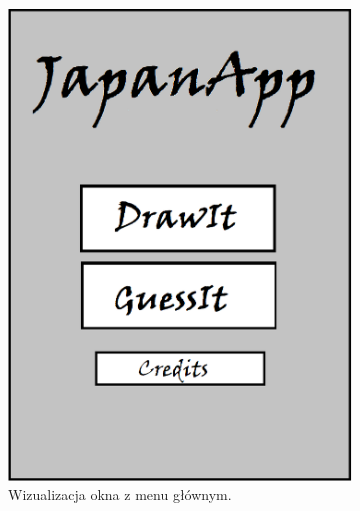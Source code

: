 \documentclass[15pt]{article}
\begin{document}
  \begin{figure}[h!]
    \centering
    \begin{subfigure}[b]{0.35\linewidth}
      \includegraphics[width=\linewidth]{menu.png}
      \caption{Wizualizacja okna z menu głównym.}
      \label{rysunek1}
    \end{subfigure}
    \begin{subfigure}[b]{0.35\linewidth}

\end{subfigure}
\end{figure}
\end{document}
